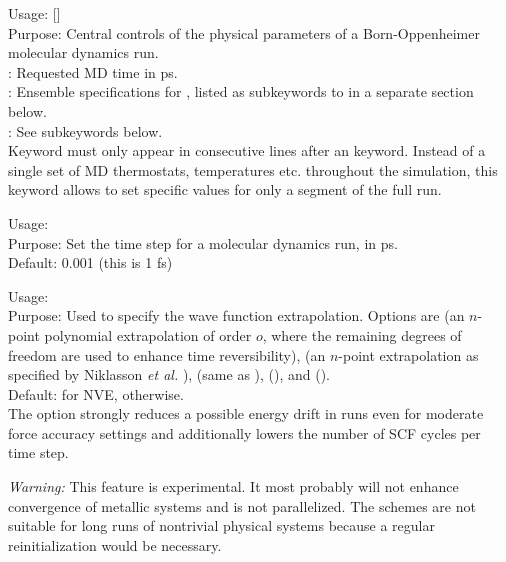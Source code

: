 {\noindent
   Usage:   
     [] \\[1.0ex] 
   Purpose: Central controls of the physical parameters of a
     Born-Oppenheimer molecular dynamics run. \\[1.0ex]
    : Requested MD time in ps. \\
    : Ensemble specifications for ,
     listed as subkeywords to  in a separate section
     below. \\
   : See  subkeywords
     below. \\
} 
Keyword  must only appear in consecutive lines after an
 keyword. Instead of a single set of MD thermostats,
temperatures etc. throughout the simulation, this keyword allows to set
specific values for only a segment of the full run.

{\noindent
	Usage:   \\[1.0em]
	Purpose: Set the time step for a molecular dynamics run, in ps. \\[1.0em]
	Default: 0.001 (this is 1 fs)
	}

{\noindent
  Usage:   \\[1.0em]
  Purpose: Used to specify the wave function extrapolation.  Options are
   (an $n$-point polynomial extrapolation of
  order $o$, where the remaining degrees of freedom are used to enhance time
  reversibility),  (an $n$-point extrapolation as
  specified by Niklasson \emph{et al.} \cite{nik06}),  (same as
  ),  (), and  ().\\[1.0em]
  Default:  for NVE,  otherwise.\\
}
The option  strongly reduces a possible energy drift
in  runs even for moderate force accuracy settings and
additionally lowers the number of SCF cycles per time step.

\emph{Warning:} This feature is experimental.  It most probably will
not enhance convergence of metallic systems and is not parallelized.  The
 schemes are not suitable for long runs of nontrivial
physical systems because a regular reinitialization would be necessary.

